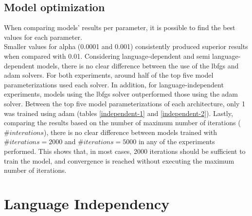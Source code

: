\subsection{Model optimization}

When comparing models' results per parameter, it is possible to find the best values for each parameter. \\
Smaller values for alpha (0.0001 and 0.001) consistently produced superior results when compared with 0.01. Considering language-dependent and semi language-dependent models, there is no clear difference between the use of the lbfgs and adam solvers. For both experiments, around half of the top five model parameterizations used each solver. In addition, for language-independent experiments, models using the lbfgs solver outperformed those using the adam solver. Between the top five model parameterizations of each architecture, only 1 was trained using adam (tables \ref{independent-1} and \ref{independent-2}). Lastly, comparing the results based on the number of maximum number of iterations ($\#interations$), there is no clear difference between models trained with $\#iterations = 2000$ and $\#iterations = 5000$ in any of the experiments performed. This shows that, in most cases, 2000 iterations should be sufficient to train the model, and convergence is reached without executing the maximum number of iterations.

\section{Language Independency}

